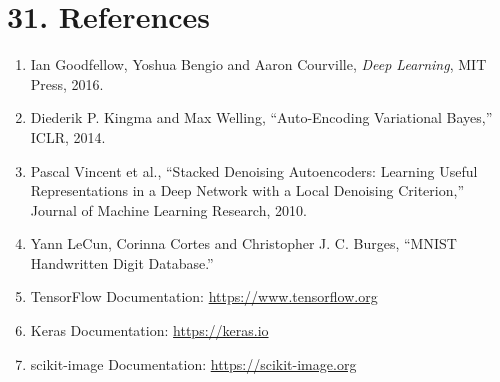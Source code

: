 \documentclass[10pt]{article}
\begin{document}
\section*{31. References}

\begin{enumerate}
\item Ian Goodfellow, Yoshua Bengio and Aaron Courville,
\emph{Deep Learning}, MIT Press, 2016.

\item Diederik P. Kingma and Max Welling,
``Auto-Encoding Variational Bayes,'' ICLR, 2014.

\item Pascal Vincent et al.,
``Stacked Denoising Autoencoders: Learning Useful Representations in a Deep
Network with a Local Denoising Criterion,'' Journal of Machine Learning
Research, 2010.

\item Yann LeCun, Corinna Cortes and Christopher J. C. Burges,
``MNIST Handwritten Digit Database.''

\item TensorFlow Documentation:
\url{https://www.tensorflow.org}

\item Keras Documentation:
\url{https://keras.io}

\item scikit-image Documentation:
\url{https://scikit-image.org}
\end{enumerate}
\end{document}
